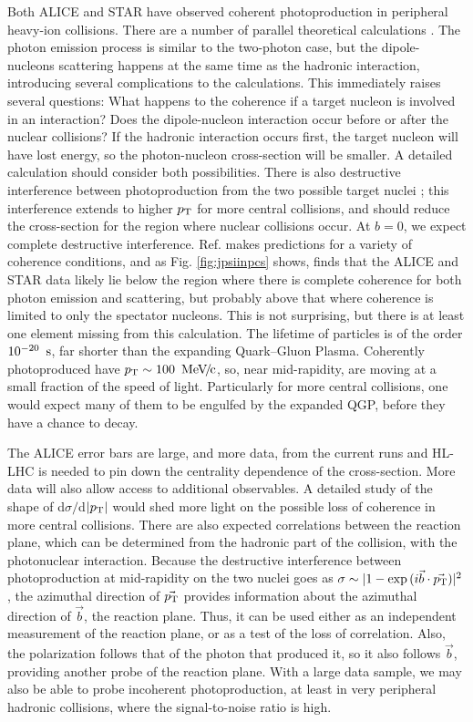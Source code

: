 \documentclass[../report.tex]{subfiles}
\begin{document}
Both ALICE \cite{Adam:2015gba}  and STAR \cite{Zha:2018ohg} have observed coherent \PJGy photoproduction in peripheral heavy-ion collisions.  There are a number of parallel theoretical calculations \cite{Klusek-Gawenda:2015hja,Zha:2017jch}.  The photon emission process is similar to the two-photon case, but the dipole-nucleons scattering happens at the same time as the hadronic interaction, introducing several complications to the calculations.  This immediately raises several questions:  What happens to the coherence if a target nucleon is involved in an interaction?   Does the dipole-nucleon interaction occur before or after the nuclear collisions?    If the hadronic interaction occurs first, the target nucleon will have lost energy, so the photon-nucleon cross-section will be smaller.  A detailed calculation should consider both possibilities.   There is also destructive interference between photoproduction from the two possible target nuclei \cite{Abelev:2008ew}; this interference extends to higher $p\sb{\scriptstyle\mathrm{T}}$ for more central collisions, and should reduce the cross-section for the region where nuclear collisions occur. At $b=0$, we expect complete destructive interference.  Ref. \cite{Zha:2017jch} makes predictions for a variety of coherence conditions, and as Fig. \ref{fig:jpsiinpcs} shows, finds that the ALICE and STAR data likely lie below the region where there is complete coherence for both photon emission and scattering, but probably above that where coherence is limited to only the spectator nucleons.  This is not surprising, but there is at least one element missing from this calculation. The lifetime of \PJGy particles is of the order $\unit[10^{-20}]{\Us}$, far shorter than the expanding Quark--Gluon Plasma.  Coherently photoproduced \PJGy have $\pT \sim \unit[100]{\UMeVc}$, so, near mid-rapidity,  are moving at a small fraction of the speed of light.  Particularly for more central collisions, one would expect many of them to be engulfed by the expanded QGP, before they have a chance to decay.  

The ALICE error bars are large, and more data, from the current runs and HL-LHC is needed to pin down the centrality dependence of the cross-section.  More data will also allow access to additional observables.  A detailed study of the shape of d$\sigma/$d$|p\sb{\scriptstyle\mathrm{T}}|$ would shed more light on the possible loss of coherence in more central collisions. There are also expected correlations between the reaction plane, which can be determined from the hadronic part of the collision, with the photonuclear interaction.  Because the destructive interference between photoproduction at mid-rapidity on the two nuclei goes as $\sigma \sim |1-\exp{(i{\vec{b}\cdot\vec{\pT})}}|^2$ \cite{Klein:1999gv}, the azimuthal direction of $\vec{p\sb{\scriptstyle\mathrm{T}}}$ provides information about the azimuthal direction of $\vec{b}$, \ie the reaction plane.  Thus, it can be used either as an independent measurement of the reaction plane, or as a test of the loss of correlation.  Also, the \PJGy polarization follows that of the photon that produced it, so it also follows $\vec{b}$, providing another probe of the reaction plane.  With a large data sample, we may also be able to probe incoherent \PJGy photoproduction, at least in very peripheral hadronic collisions, where the signal-to-noise ratio is high.  
\end{document}
